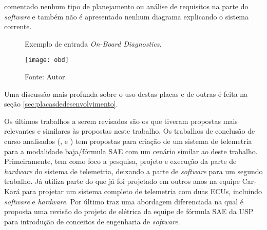 comentado nenhum tipo de planejamento ou análise de requisitos na parte do \textit{software} e também não é apresentado nenhum diagrama explicando o sistema corrente.    

\begin{figure}[!htb]
	\centering
		\caption{Exemplo de entrada \textit{On-Board Diagnostics}.}
		\texttt{[image: obd]} 
		\caption*{Fonte: Autor.}
		\label{fig:obd}
\end{figure}

Uma discussão mais profunda sobre o uso destas placas e de outras é feita na seção \ref{sec:placasdedesenvolvimento}. 

Os últimos trabalhos a serem revisados são os que tiveram propostas mais relevantes e similares às propostas neste trabalho. Os trabalhos de conclusão de curso analisados (\cite{Dias2010}, \cite{Nunes2016} e \cite{Pereira2012}) tem propostas para criação de um sistema de telemetria para a modalidade baja/fórmula SAE com um cenário similar ao deste trabalho. Primeiramente,  tem como foco a pesquisa, projeto e execução da parte de \textit{hardware} do sistema de telemetria, deixando a parte de \textit{software} para um segundo trabalho. Já  utiliza parte do que já foi projetado em outros anos na equipe Car-Kará para projetar um sistema completo de telemetria com duas ECUs, incluindo \textit{software} e \textit{hardware}. Por último  traz uma abordagem diferenciada na qual é proposta uma revisão do projeto de elétrica da equipe de fórmula SAE da USP para introdução de conceitos de engenharia de \textit{software}.

